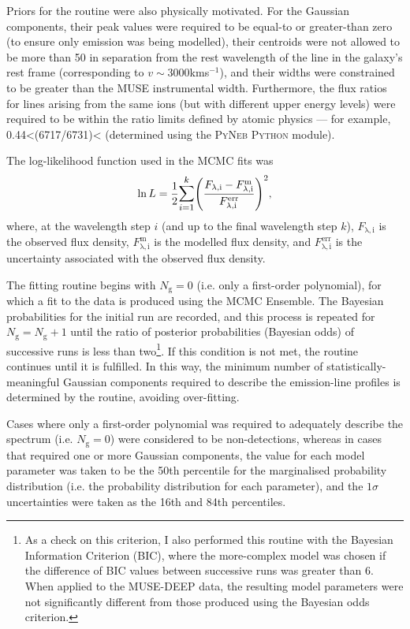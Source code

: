 Priors for the routine were also physically motivated. For the Gaussian components, their peak values were required to be equal-to or greater-than zero (to ensure only emission was being modelled), their centroids were not allowed to be more than 50\;{\AA} in separation from the rest wavelength of the line in the galaxy's rest frame (corresponding to $v\sim3000$\;km\;s$^{-1}$), and their widths were constrained to be greater than the MUSE instrumental width. Furthermore, the flux ratios for lines arising from the same ions (but with different upper energy levels) were required to be within the ratio limits defined by atomic physics --- for example, 0.44\;\textless\;[SII](6717/6731)\;\textless{} (determined using the \textsc{PyNeb Python} module). 

The log-likelihood function used in the MCMC fits was
\begin{equation}
    \ln L=\frac{1}{2}\mathlarger{\sum^k_{i=1}}\Biggl(\frac{F_\mathrm{\lambda,i}-F^\mathrm{m}_\mathrm{\lambda,i}}{F^\mathrm{err}_\mathrm{\lambda,i}}\Biggl)^2,
    \label{eq: analysis_and_results: chisq}
\end{equation}
where, at the wavelength step $i$ (and up to the final wavelength step $k$), $F_\mathrm{\lambda,i}$ is the observed flux density, $F^\mathrm{m}_\mathrm{\lambda,i}$ is the modelled flux density, and ${F^\mathrm{err}_\mathrm{\lambda,i}}$ is the uncertainty associated with the observed flux density.

The fitting routine begins with $N_\mathrm{g}=0$ (i.e. only a first-order polynomial), for which a fit to the data is produced using the MCMC Ensemble. The Bayesian probabilities for the initial run are recorded, and this process is repeated for $N_\mathrm{g}=N_\mathrm{g}+1$ until the ratio of posterior probabilities (Bayesian odds) of successive runs is less than two\footnote{As a check on this criterion, I also performed this routine with the Bayesian Information Criterion (BIC), where the more-complex model was chosen if the difference of BIC values between successive runs was greater than 6. When applied to the MUSE-DEEP data, the resulting model parameters were not significantly different from those produced using the Bayesian odds criterion.}. If this condition is not met, the routine continues until it is fulfilled. In this way, the minimum number of statistically-meaningful Gaussian components required to describe the emission-line profiles is determined by the routine, avoiding over-fitting. 

Cases where only a first-order polynomial was required to adequately describe the spectrum (i.e. $N_\mathrm{g}=0$) were considered to be non-detections, whereas in cases that required one or more Gaussian components, the value for each model parameter was taken to be the 50th percentile for the marginalised probability distribution (i.e. the probability distribution for each parameter), and the $1\sigma$ uncertainties were taken as the 16th and 84th percentiles.

